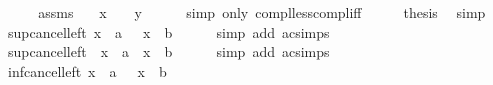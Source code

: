 \begin{isabellebody}
%
\isadelimproof
%
\endisadelimproof
%
\isatagproof
{}\isamarkupfalse%
\ {\isacharminus}{\kern0pt}\isanewline
\ \ \isamarkupfalse%
\ assms\ \isamarkupfalse%
\ {\isachardoublequoteopen}{\isacharminus}{\kern0pt}\ x\ {\isacharless}{\kern0pt}\ {\isacharminus}{\kern0pt}\ {\isacharparenleft}{\kern0pt}{\isacharminus}{\kern0pt}\ y{\isacharparenright}{\kern0pt}{\isachardoublequoteclose}\isanewline
\ \ \ \ \isamarkupfalse%
\ {\isacharparenleft}{\kern0pt}simp\ only{\isacharcolon}{\kern0pt}\ compl{\isacharunderscore}{\kern0pt}less{\isacharunderscore}{\kern0pt}compl{\isacharunderscore}{\kern0pt}iff{\isacharparenright}{\kern0pt}\isanewline
\ \ \isamarkupfalse%
\ \isamarkupfalse%
\ {\isacharquery}{\kern0pt}thesis\ \isamarkupfalse%
\ simp\isanewline
{}\isamarkupfalse%
%
\endisatagproof
{\isafoldproof}%
%
\isadelimproof
\isanewline
%
\endisadelimproof
\isanewline
{}\isamarkupfalse%
\ sup{\isacharunderscore}{\kern0pt}cancel{\isacharunderscore}{\kern0pt}left{}{\isacharcolon}{\kern0pt}\ {\isacartoucheopen}x\ {\isasymsqunion}\ a\ {\isasymsqunion}\ {\isacharparenleft}{\kern0pt}{\isacharminus}{\kern0pt}\ x\ {\isasymsqunion}\ b{\isacharparenright}{\kern0pt}\ {\isacharequal}{\kern0pt}\ {\isasymtop}{\isacartoucheclose}\isanewline
%
\isadelimproof
\ \ %
\endisadelimproof
%
\isatagproof
{}\isamarkupfalse%
\ {\isacharparenleft}{\kern0pt}simp\ add{\isacharcolon}{\kern0pt}\ ac{\isacharunderscore}{\kern0pt}simps{\isacharparenright}{\kern0pt}%
\endisatagproof
{\isafoldproof}%
%
\isadelimproof
\isanewline
%
\endisadelimproof
\isanewline
{}\isamarkupfalse%
\ sup{\isacharunderscore}{\kern0pt}cancel{\isacharunderscore}{\kern0pt}left{}{\isacharcolon}{\kern0pt}\ {\isacartoucheopen}{\isacharminus}{\kern0pt}\ x\ {\isasymsqunion}\ a\ {\isasymsqunion}\ {\isacharparenleft}{\kern0pt}x\ {\isasymsqunion}\ b{\isacharparenright}{\kern0pt}\ {\isacharequal}{\kern0pt}\ {\isasymtop}{\isacartoucheclose}\isanewline
%
\isadelimproof
\ \ %
\endisadelimproof
%
\isatagproof
{}\isamarkupfalse%
\ {\isacharparenleft}{\kern0pt}simp\ add{\isacharcolon}{\kern0pt}\ ac{\isacharunderscore}{\kern0pt}simps{\isacharparenright}{\kern0pt}%
\endisatagproof
{\isafoldproof}%
%
\isadelimproof
\isanewline
%
\endisadelimproof
\isanewline
{}\isamarkupfalse%
\ inf{\isacharunderscore}{\kern0pt}cancel{\isacharunderscore}{\kern0pt}left{}{\isacharcolon}{\kern0pt}\ {\isacartoucheopen}x\ {\isasymsqinter}\ a\ {\isasymsqinter}\ {\isacharparenleft}{\kern0pt}{\isacharminus}{\kern0pt}\ x\ {\isasymsqinter}\ b{\isacharparenright}{\kern0pt}\ {\isacharequal}{\kern0pt}\ {\isasymbottom}{\isacartoucheclose}\isanewline

\end{isabellebody}
